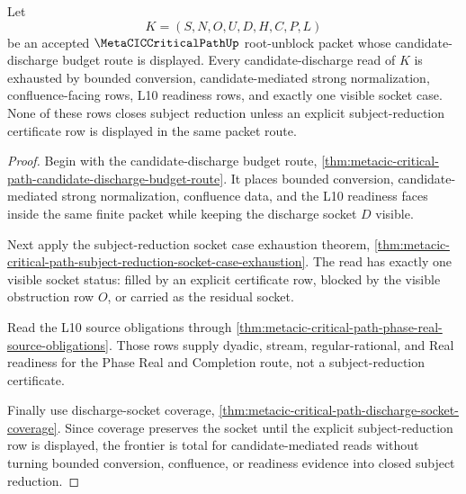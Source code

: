 \begin{theorem}
\label{thm:metacic-critical-path-candidate-discharge-frontier-totality}
Let
$$
K=(S,N,O,U,D,H,C,P,L)
$$
be an accepted $\MetaCICCriticalPathUp$ root-unblock packet whose candidate-discharge budget route is displayed. Every candidate-discharge read of $K$ is exhausted by bounded conversion, candidate-mediated strong normalization, confluence-facing rows, L10 readiness rows, and exactly one visible socket case. None of these rows closes subject reduction unless an explicit subject-reduction certificate row is displayed in the same packet route.
\end{theorem}
\begin{proof}
Begin with the candidate-discharge budget route, \autoref{thm:metacic-critical-path-candidate-discharge-budget-route}. It places bounded conversion, candidate-mediated strong normalization, confluence data, and the L10 readiness faces inside the same finite packet while keeping the discharge socket $D$ visible.

Next apply the subject-reduction socket case exhaustion theorem, \autoref{thm:metacic-critical-path-subject-reduction-socket-case-exhaustion}. The read has exactly one visible socket status: filled by an explicit certificate row, blocked by the visible obstruction row $O$, or carried as the residual socket.

Read the L10 source obligations through \autoref{thm:metacic-critical-path-phase-real-source-obligations}. Those rows supply dyadic, stream, regular-rational, and Real readiness for the Phase Real and Completion route, not a subject-reduction certificate.

Finally use discharge-socket coverage, \autoref{thm:metacic-critical-path-discharge-socket-coverage}. Since coverage preserves the socket until the explicit subject-reduction row is displayed, the frontier is total for candidate-mediated reads without turning bounded conversion, confluence, or readiness evidence into closed subject reduction.
\end{proof}
